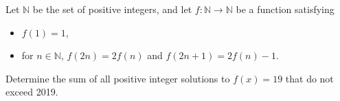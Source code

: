 Let $\mathbb{N}$ be the set of positive integers, and let $f: \mathbb{N} \to \mathbb{N}$ be a function satisfying
\begin{itemize}
	\item $f(1) = 1$,
	\item for $n \in \mathbb{N}$, $f(2n) = 2f(n)$ and $f(2n+1) = 2f(n) - 1$.
\end{itemize}
Determine the sum of all positive integer solutions to $f(x) = 19$ that do not exceed 2019.
